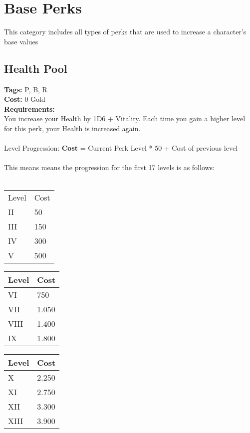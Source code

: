 \chapter{Base Perks}\label{ch:basePerks}
This category includes all types of perks that are used to increase a character's base values

\section{Health Pool}\label{sec:healthpool}
\textbf{Tags:} P, B, R\\
\textbf{Cost:} 0 Gold\\
\textbf{Requirements:} -\\
You increase your Health by 1D6 + Vitality.
Each time you gain a higher level for this perk, your Health is increased again.\\
\\
Level Progression: \textbf{Cost} = Current Perk Level * 50 + Cost of previous level\\
\\
This means means the progression for the first 17 levels is as follows:\\
\\
\begin{minipage}{0.25\textwidth}
    \begin{tabular}{l | l}
        Level & Cost\\
        II & 50\\
        III & 150\\
        IV & 300\\
        V & 500\\
    \end{tabular}
\end{minipage}
\begin{minipage}{0.25\textwidth}
    \begin{tabular}{l | l}
        Level & Cost\\ \hline
        VI & 750\\
        VII & 1.050\\
        VIII & 1.400\\
        IX & 1.800\\
    \end{tabular}
\end{minipage}
\begin{minipage}{0.25\textwidth}
    \begin{tabular}{l | l}
        Level & Cost\\ \hline
        X & 2.250\\
        XI & 2.750\\
        XII & 3.300\\
        XIII & 3.900\\
    \end{tabular}
\end{minipage}
